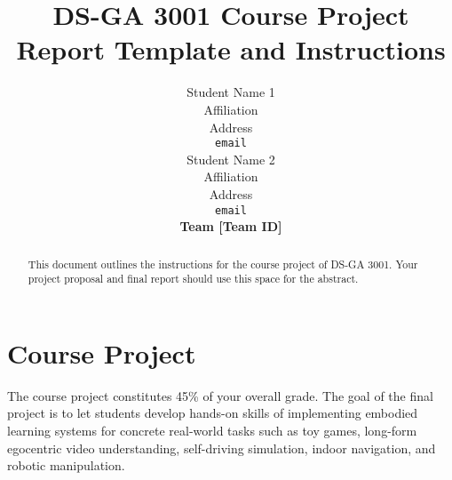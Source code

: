 \documentclass{article}
\title{DS-GA 3001 Course Project \\ Report Template and Instructions}
\author{
  Student Name 1 \\
  Affiliation \\
  Address \\
  \texttt{email} \\
  \And
  Student Name 2 \\
  Affiliation \\
  Address \\
  \texttt{email} \\
  \AND
 \textbf{Team [Team ID]}
}
\begin{document}
\maketitle

\begin{abstract}
  This document outlines the instructions for the course project of DS-GA 3001. Your project proposal and final report should use this space for the abstract.
\end{abstract}

\section{Course Project}
The course project constitutes 45\% of your overall grade. The goal of the final project is to let students develop hands-on skills of implementing embodied learning systems for concrete real-world tasks such as toy games, long-form egocentric video understanding, self-driving simulation, indoor navigation, and robotic manipulation. 
\end{document}
